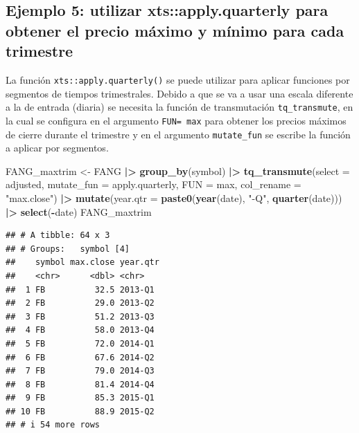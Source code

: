 \documentclass[
]{book}
\newenvironment{Shaded}{\begin{snugshade}}{\end{snugshade}}
\newcommand{\AttributeTok}[1]{\textcolor[rgb]{0.13,0.29,0.53}{#1}}
\newcommand{\FunctionTok}[1]{\textcolor[rgb]{0.13,0.29,0.53}{\textbf{#1}}}
\newcommand{\NormalTok}[1]{#1}
\newcommand{\OtherTok}[1]{\textcolor[rgb]{0.56,0.35,0.01}{#1}}
\newcommand{\SpecialCharTok}[1]{\textcolor[rgb]{0.81,0.36,0.00}{\textbf{#1}}}
\newcommand{\StringTok}[1]{\textcolor[rgb]{0.31,0.60,0.02}{#1}}
\begin{document}
\hypertarget{ejemplo-5-utilizar-xtsapply.quarterly-para-obtener-el-precio-muxe1ximo-y-muxednimo-para-cada-trimestre}{%
\subsection{Ejemplo 5: utilizar xts::apply.quarterly para obtener el precio máximo y mínimo para cada trimestre}\label{ejemplo-5-utilizar-xtsapply.quarterly-para-obtener-el-precio-muxe1ximo-y-muxednimo-para-cada-trimestre}}

La función \texttt{xts::apply.quarterly()} se puede utilizar para aplicar funciones por segmentos de tiempos trimestrales. Debido a que se va a usar una escala diferente a la de entrada (diaria) se necesita la función de transmutación \texttt{tq\_transmute}, en la cual se configura en el argumento \texttt{FUN=\ max} para obtener los precios máximos de cierre durante el trimestre y en el argumento \texttt{mutate\_fun} se escribe la función a aplicar por segmentos.

\begin{Shaded}
\begin{Highlighting}[]
\NormalTok{FANG\_maxtrim }\OtherTok{\textless{}{-}}\NormalTok{ FANG }\SpecialCharTok{|\textgreater{}} \FunctionTok{group\_by}\NormalTok{(symbol) }\SpecialCharTok{|\textgreater{}} 
                        \FunctionTok{tq\_transmute}\NormalTok{(}\AttributeTok{select =}\NormalTok{ adjusted,}
                                     \AttributeTok{mutate\_fun =}\NormalTok{ apply.quarterly,}
                                     \AttributeTok{FUN =}\NormalTok{ max,}
                                     \AttributeTok{col\_rename =} \StringTok{"max.close"}\NormalTok{) }\SpecialCharTok{|\textgreater{}} 
                        \FunctionTok{mutate}\NormalTok{(}\AttributeTok{year.qtr =} \FunctionTok{paste0}\NormalTok{(}\FunctionTok{year}\NormalTok{(date), }\StringTok{"{-}Q"}\NormalTok{, }\FunctionTok{quarter}\NormalTok{(date))) }\SpecialCharTok{|\textgreater{}} 
                        \FunctionTok{select}\NormalTok{(}\SpecialCharTok{{-}}\NormalTok{date)}
\NormalTok{FANG\_maxtrim}
\end{Highlighting}
\end{Shaded}

\begin{verbatim}
## # A tibble: 64 x 3
## # Groups:   symbol [4]
##    symbol max.close year.qtr
##    <chr>      <dbl> <chr>   
##  1 FB          32.5 2013-Q1 
##  2 FB          29.0 2013-Q2 
##  3 FB          51.2 2013-Q3 
##  4 FB          58.0 2013-Q4 
##  5 FB          72.0 2014-Q1 
##  6 FB          67.6 2014-Q2 
##  7 FB          79.0 2014-Q3 
##  8 FB          81.4 2014-Q4 
##  9 FB          85.3 2015-Q1 
## 10 FB          88.9 2015-Q2 
## # i 54 more rows
\end{verbatim}
\end{document}
